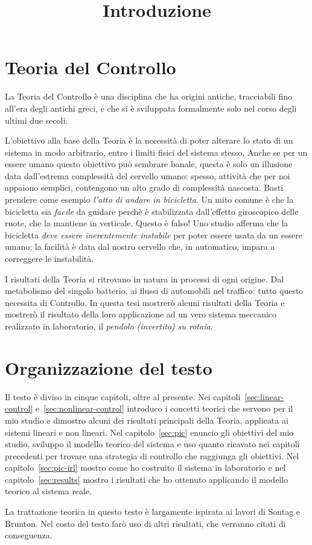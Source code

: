 
\title{Introduzione}
\maketitle
\label{sec:intro}


\section{Teoria del Controllo}
La Teoria del Controllo è una disciplina che ha origini antiche,
tracciabili fino all'era degli antichi greci,
e che si è sviluppata formalmente solo nel corso degli ultimi due secoli.

L'obiettivo alla base della Teoria è la necessità di poter alterare
lo stato di un sistema in modo arbitrario, entro i limiti fisici
del sistema stesso.
Anche se per un essere umano questo obiettivo può sembrare banale,
questa è solo un illusione data dall'estrema complessità del cervello umano:
spesso, attività che per noi appaiono semplici, contengono un
alto grado di complessità nascosta.
Basti prendere come esempio \emph{l'atto di andare in bicicletta}.
Un mito comune è che la bicicletta sia \emph{facile} da guidare perchè
è stabilizzata dall'effetto giroscopico delle ruote, che la mantiene in verticale.
Questo è falso!
Uno studio
afferma che la bicicletta \emph{deve essere inerentemente instabile} per poter
essere usata da un essere umano; la facilità è data dal nostro cervello che,
in automatico, impara a correggere le instabilità.

I risultati della Teoria si ritrovano in natura in processi di ogni origine.
Dal metabolismo del singolo batterio, ai flussi di automobili nel traffico:
tutto questo necessita di Controllo.
In questa tesi mostrerò alcuni risultati della Teoria e
mostrerò il risultato della loro applicazione ad un vero sistema
meccanico realizzato in laboratorio, il \emph{pendolo (invertito) su rotaia}.

\section{Organizzazione del testo}
Il testo è diviso in cinque capitoli, oltre al presente.
Nei capitoli~\ref{sec:linear-control} e~\ref{sec:nonlinear-control} introduco
i concetti teorici che servono per il mio studio e dimostro alcuni dei risultati
principali della Teoria, applicata ai sistemi lineari e non lineari.
Nel capitolo~\ref{sec:pic} enuncio gli obiettivi del mio studio, sviluppo il modello
teorico del sistema e uso quanto ricavato nei capitoli
precedenti per trovare una strategia di controllo che raggiunga gli obiettivi.
Nel capitolo~\ref{sec:pic-irl} mostro come ho costruito il sistema in laboratorio
e nel capitolo~\ref{sec:results} mostro i risultati che ho ottenuto applicando
il modello teorico al sistema reale.

La trattazione teorica in questo testo è largamente ispirata ai lavori di
Sontag e Brunton.
Nel costo del testo farò uso di altri risultati, che verranno citati di conseguenza.